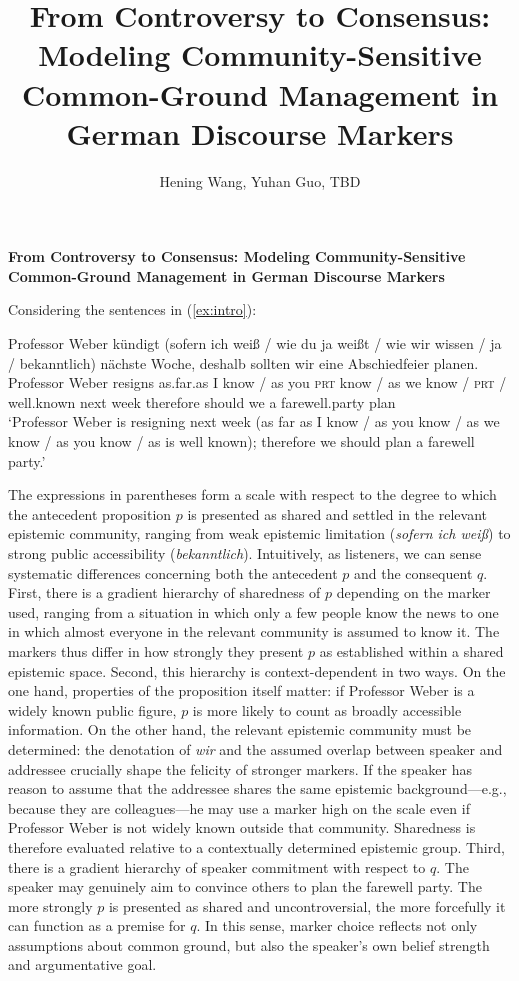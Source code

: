\documentclass[12pt]{article}
\title{From Controversy to Consensus: Modeling Community-Sensitive Common-Ground Management in German Discourse Markers}
\author{Hening Wang, Yuhan Guo, TBD}
\date{}
\begin{document}

\textbf{\large From Controversy to Consensus: Modeling Community-Sensitive Common-Ground Management in German Discourse Markers}

Considering the sentences in (\ref{ex:intro}):

\begin{exe}
\ex \label{ex:intro}
Professor Weber kündigt (sofern ich weiß / wie du ja weißt / wie wir wissen / ja / bekanntlich) nächste Woche, deshalb sollten wir eine Abschiedfeier planen.\\
Professor Weber resigns as.far.as I know / as you \textsc{prt} know / as we know / \textsc{prt} / well.known next week therefore should we a farewell.party plan\\
`Professor Weber is resigning next week (as far as I know / as you know / as we know / as you know / as is well known); therefore we should plan a farewell party.'
\end{exe}

The expressions in parentheses form a scale with respect to the degree to which the antecedent proposition $p$ is presented as shared and settled in the relevant epistemic community, ranging from weak epistemic limitation (\textit{sofern ich weiß}) to strong public accessibility (\textit{bekanntlich}). Intuitively, as listeners, we can sense systematic differences concerning both the antecedent $p$ and the consequent $q$. First, there is a gradient hierarchy of sharedness of $p$ depending on the marker used, ranging from a situation in which only a few people know the news to one in which almost everyone in the relevant community is assumed to know it. The markers thus differ in how strongly they present $p$ as established within a shared epistemic space. Second, this hierarchy is context-dependent in two ways. On the one hand, properties of the proposition itself matter: if Professor Weber is a widely known public figure, $p$ is more likely to count as broadly accessible information. On the other hand, the relevant epistemic community must be determined: the denotation of \textit{wir} and the assumed overlap between speaker and addressee crucially shape the felicity of stronger markers. If the speaker has reason to assume that the addressee shares the same epistemic background—e.g., because they are colleagues—he may use a marker high on the scale even if Professor Weber is not widely known outside that community. Sharedness is therefore evaluated relative to a contextually determined epistemic group. Third, there is a gradient hierarchy of speaker commitment with respect to $q$. The speaker may genuinely aim to convince others to plan the farewell party. The more strongly $p$ is presented as shared and uncontroversial, the more forcefully it can function as a premise for $q$. In this sense, marker choice reflects not only assumptions about common ground, but also the speaker’s own belief strength and argumentative goal.
\end{document}
